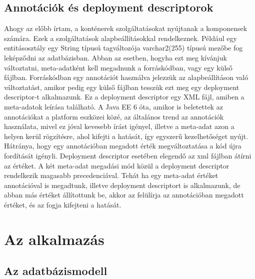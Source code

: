 \documentclass[centeredchapter]{thesis-ekf}
\theoremstyle{definition}
\theoremstyle{remark}
\begin{document}
\section{Annotációk és deployment descriptorok}

Ahogy az előbb írtam, a konténerek szolgáltatásokat nyújtanak a komponensek számára. Ezek a szolgáltatások alapbeállításokkal rendelkeznek. Például egy entitásosztály egy String típusú tagváltozója varchar2(255) típusú mezőbe fog leképződni az adatbázisban. Abban az esetben, hogyha ezt meg kívánjuk változtatni, meta-adatként kell megadnunk a forráskódban, vagy egy külső fájlban. Forráskódban egy annotációt használva jelezzük az alapbeállításon való változtatást, amikor pedig egy külső fájlban tesszük ezt meg egy deployment descriptor-t alkalmazunk. Ez a deployment descriptor egy XML fájl, amiben a meta-adatok leírása található. A Java EE 6 óta, amikor is beletettek az annotációkat a platform eszközei közé, az általános trend az annotációk használata, mivel ez jóval kevesebb írást igényel, illetve a meta-adat azon a helyen kerül rögzítésre, ahol kifejti a hatását, így egyszerű kezelhetőséget nyújt. Hátránya, hogy egy annotációban megadott érték megváltoztatása a kód újra fordítását igényli. Deployment descriptor esetében elegendő az xml fájlban átírni az értéket.
A két meta-adat megadási mód közül a deployment descriptor rendelkezik magasabb precedenciával. Tehát ha egy meta-adat értéket annotációval is megadtunk, illetve deployment descriptort is alkalmazunk, de abban más értéket állítottunk be, akkor az felülírja az annotációban megadott értéket, és az fogja kifejteni a hatását.\cite{BJEE}

\chapter{Az alkalmazás}

\section{Az adatbázismodell}
\end{document}
